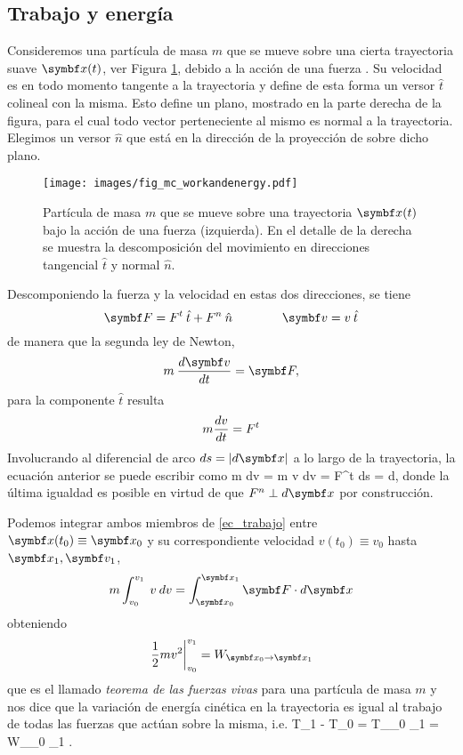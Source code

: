 \documentclass[10pt,oneside]{CBFT_book}
\begin{document}
\subsection{Trabajo y energía}

Consideremos una partícula de masa $ m $ que se mueve sobre una cierta trayectoria suave $\vb{x}(t)$, ver {Figura} 
\ref{fig_mc_workenergy}, debido a la acción de una fuerza .
Su velocidad  es en todo momento tangente a la trayectoria y define de esta forma un versor $ \hat{t} $
colineal con la misma. Esto define un plano, mostrado en la parte derecha de la figura, para el cual todo vector
perteneciente al mismo es normal a la trayectoria. Elegimos un versor $ \hat{n} $ que está en la dirección de
la proyección de  sobre dicho plano.

\begin{figure}[!h]
	\begin{center}
	\texttt{[image: images/fig\_mc\_workandenergy.pdf]}	
	\end{center}
	\caption{Partícula de masa $m$ que se mueve sobre una trayectoria $\vb{x}(t)$ bajo la acción de una fuerza 
 (izquierda). En el detalle de la derecha se muestra la descomposición del movimiento en direcciones
tangencial $\hat{t}$ y normal $\hat{n}$.}
	\label{fig_mc_workenergy}
\end{figure} 

Descomponiendo la fuerza y la velocidad en estas dos direcciones, se tiene 
\[
	\vb{F} = F^t \: \hat{t}  + F^n \: \hat{n} \qquad \qquad \vb{v} = v \: \hat{t}
\]
de manera que la segunda ley de Newton, 
\[
	m \: \dtot{\vb{v}}{t} = \vb{F},
\]
para la componente $\hat{t}$ resulta
\[
	m \frac{d^{\hspace{-0.05em}} {v}}{d {t}^{\hspace{-0.05em}}} = F^t
\]
Involucrando al diferencial de arco $ ds = | d\vb{x} | $ a lo largo de la trayectoria, la ecuación anterior se
puede escribir como
\be
	m \: dv \: = m \: v \: dv = F^t \: ds =  \cdot d,
	\label{ec_trabajo}
\ee
donde la última igualdad es posible en virtud de que $ F^n \perp d\vb{x} $ por construcción.

Podemos integrar ambos miembros de \eqref{ec_trabajo} entre $\vb{x}(t_0) \equiv \vb{x}_0$ y su 
correspondiente velocidad $v(t_0) \equiv v_0$ hasta $\vb{x}_1, \vb{v}_1$, 
\[
	m \int_{v_0}^{v_1} \: v \: dv = \int_{\vb{x}_0}^{\vb{x}_1}  \vb{F} \cdot d\vb{x}
\]
obteniendo
\[
	\left. \frac{1}{2} m v^2 \right|_{v_0}^{v_1} = W_{\vb{x}_0 \to \vb{x}_1} 
\]
que es el llamado \emph{teorema de las fuerzas vivas} para una partícula de masa $m$ y nos dice que la
variación de energía cinética en la trayectoria es igual al trabajo de todas las fuerzas que actúan
sobre la misma, i.e.
\be
	T_1 - T_0 = \Delta T_{_0 \to {}_1}  = W_{_0 \to {}_1} .
	\label{conser_energia}
\ee
\end{document}

